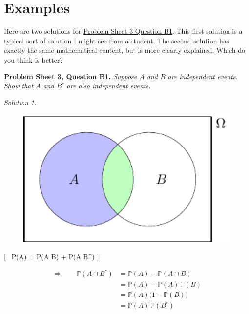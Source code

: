 \documentclass[
  letterpaper,
  DIV=11,
  numbers=noendperiod]{scrreprt}
\theoremstyle{remark}
\begin{document}
\hypertarget{writing-ex}{%
\section*{Examples}\label{writing-ex}}


Here are two solutions for \protect\hyperlink{P3-long}{Problem Sheet 3
Question B1}. This first solution is a typical sort of solution I might
see from a student. The second solution has exactly the same
mathematical content, but is more clearly explained. Which do you think
is better?

\textbf{Problem Sheet 3, Question B1.} \emph{Suppose \(A\) and \(B\) are
independent events. Show that \(A\) and \(B^\mathsf{c}\) are also
independent events.}

\emph{Solution 1.}

\begin{figure}

{\centering \includegraphics[width=4.44444in,height=\textheight]{./writing_files/figure-pdf/writing-pic-0-1.pdf}

}

\end{figure}

{[} \therefore ~\qquad \mathbb P(A) = \mathbb P(A \cap B) + \mathbb P(A
\cap B\^{}) {]}

\begin{align*}
\Rightarrow \qquad \mathbb P(A \cap B^\mathsf{c})
&= \mathbb P(A) - \mathbb P(A \cap B) \\
&= \mathbb P(A) - \mathbb P(A)\,\mathbb P(B) \\
&= \mathbb P(A) \big(1 - \mathbb P(B)\big) \\
&= \mathbb P(A) \, \mathbb P(B^\mathsf{c}) 
\end{align*}
\end{document}
